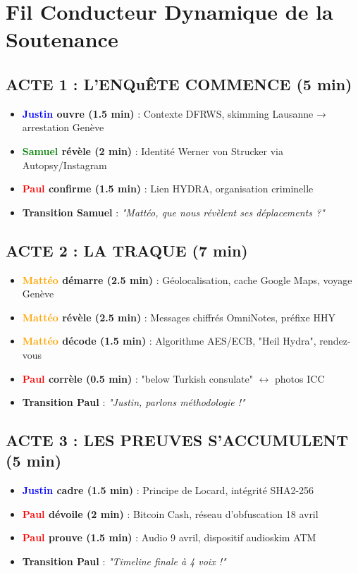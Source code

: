 \documentclass[11pt,a4paper]{article}
\begin{document}
\section{Fil Conducteur Dynamique de la Soutenance}

\subsection{ACTE 1 : L'ENQuÊTE COMMENCE (5 min)}
\begin{itemize}[leftmargin=*]
    \item \textbf{\textcolor{blue}{Justin} ouvre (1.5 min)} : Contexte DFRWS, skimming Lausanne → arrestation Genève
    \item \textbf{\textcolor{green}{Samuel} révèle (2 min)} : Identité Werner von Strucker via Autopsy/Instagram
    \item \textbf{\textcolor{red}{Paul} confirme (1.5 min)} : Lien HYDRA, organisation criminelle
    \item \textbf{Transition Samuel} : \textit{"Mattéo, que nous révèlent ses déplacements ?"}
\end{itemize}

\subsection{ACTE 2 : LA TRAQUE (7 min)}
\begin{itemize}[leftmargin=*]
    \item \textbf{\textcolor{orange}{Mattéo} démarre (2.5 min)} : Géolocalisation, cache Google Maps, voyage Genève
    \item \textbf{\textcolor{orange}{Mattéo} révèle (2.5 min)} : Messages chiffrés OmniNotes, préfixe HHY
    \item \textbf{\textcolor{orange}{Mattéo} décode (1.5 min)} : Algorithme AES/ECB, "Heil Hydra", rendez-vous
    \item \textbf{\textcolor{red}{Paul} corrèle (0.5 min)} : "below Turkish consulate" $\leftrightarrow$ photos ICC
    \item \textbf{Transition Paul} : \textit{"Justin, parlons méthodologie !"}
\end{itemize}

\subsection{ACTE 3 : LES PREUVES S'ACCUMULENT (5 min)}
\begin{itemize}[leftmargin=*]
    \item \textbf{\textcolor{blue}{Justin} cadre (1.5 min)} : Principe de Locard, intégrité SHA2-256
    \item \textbf{\textcolor{red}{Paul} dévoile (2 min)} : Bitcoin Cash, réseau d'obfuscation 18 avril
    \item \textbf{\textcolor{red}{Paul} prouve (1.5 min)} : Audio 9 avril, dispositif audioskim ATM
    \item \textbf{Transition Paul} : \textit{"Timeline finale à 4 voix !"}
\end{itemize}
\end{document}
